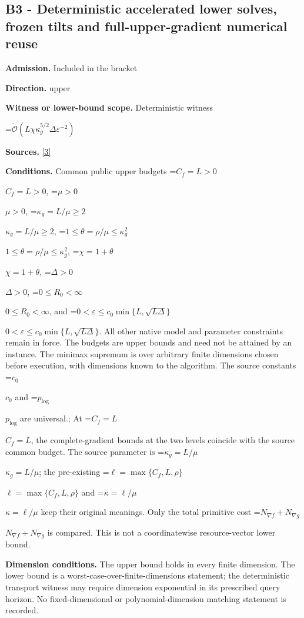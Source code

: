 \documentclass[10pt,a4paper]{article}
\newcommand{\AtlasMath}[1]{\par\begingroup\centering\setbox0=\hbox{$\displaystyle #1$}\ifdim\wd0>1.4\linewidth\typeout{ATLAS WIDE FORMULA: \the\wd0}\fi\ifdim\wd0>\linewidth\resizebox{\linewidth}{!}{\box0}\else\box0\fi\par\endgroup}
\newcommand{\AtlasInlineMath}[1]{\begingroup\setbox0=\hbox{$#1$}\ifdim\wd0>.4\linewidth\endgroup\AtlasMath{#1}\else\endgroup$#1$\fi}
\begin{document}
\subsection{B3 - Deterministic accelerated lower solves, frozen tilts and full-upper-gradient numerical reuse}


\textbf{Admission.} Included in the bracket



\textbf{Direction.} upper



\textbf{Witness or lower-bound scope.} Deterministic witness



\AtlasMath{\widetilde{\mathcal O}\!\left(L\chi\kappa_g^{5/2}\Delta\varepsilon^{-2}\right)}


\textbf{Sources.} \href{https://github.com/WU-Wendao/Colombo/blob/main/colombo_sensorium/Complexity_altas/data/sources/colombo/SFO_JOINT_20261126/manuscript.pdf}{[3]}



\textbf{Conditions.} Common public upper budgets \AtlasInlineMath{C_f=L>0}, \AtlasInlineMath{\mu>0}, \AtlasInlineMath{\kappa_g=L/\mu\ge2}, \AtlasInlineMath{1\le\theta=\rho/\mu\le\kappa_g^2}, \AtlasInlineMath{\chi=1+\theta}, \AtlasInlineMath{\Delta>0}, \AtlasInlineMath{0\le R_0<\infty}, and \AtlasInlineMath{0<\varepsilon\le c_0\min\{L,\sqrt{L\Delta}\}}. All other native model and parameter constraints remain in force. The budgets are upper bounds and need not be attained by an instance. The minimax supremum is over arbitrary finite dimensions chosen before execution, with dimensions known to the algorithm. The source constants \AtlasInlineMath{c_0} and \AtlasInlineMath{p_{\log}} are universal.; At \AtlasInlineMath{C_f=L}, the complete-gradient bounds at the two levels coincide with the source common budget. The source parameter is \AtlasInlineMath{\kappa_g=L/\mu}; the pre-existing \AtlasInlineMath{\ell=\max\{C_f,L,\rho\}} and \AtlasInlineMath{\kappa=\ell/\mu} keep their original meanings. Only the total primitive cost \AtlasInlineMath{N_{\nabla f}+N_{\nabla g}} is compared. This is not a coordinatewise resource-vector lower bound.



\textbf{Dimension conditions.} The upper bound holds in every finite dimension. The lower bound is a worst-case-over-finite-dimensions statement; the deterministic transport witness may require dimension exponential in its prescribed query horizon. No fixed-dimensional or polynomial-dimension matching statement is recorded.
\end{document}
